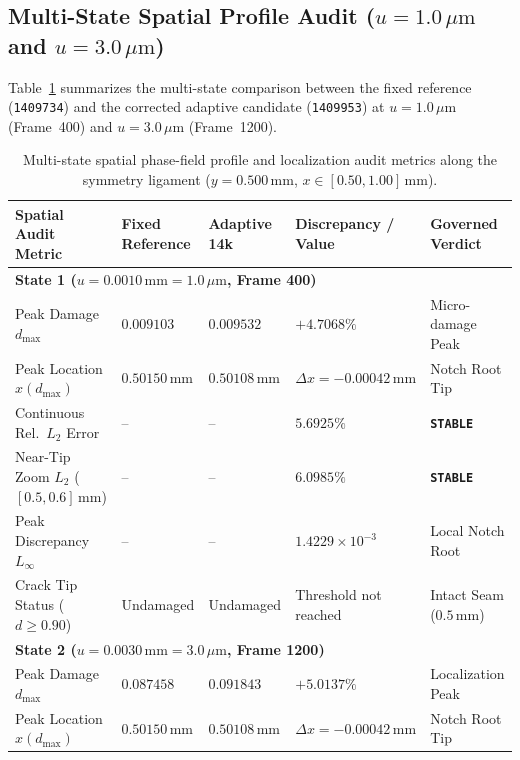 \subsection{Multi-State Spatial Profile Audit (\texorpdfstring{$u = 1.0\,\mu\mathrm{m}$}{u = 1.0 um} and \texorpdfstring{$u = 3.0\,\mu\mathrm{m}$}{u = 3.0 um})}
\label{subsec:stage14q_multistate_results}

Table~\ref{tab:stage14q_profile_comparison} summarizes the multi-state comparison between the fixed reference (\texttt{1409734}) and the corrected adaptive candidate (\texttt{1409953}) at $u = 1.0\,\mu\mathrm{m}$ (Frame~400) and $u = 3.0\,\mu\mathrm{m}$ (Frame~1200).

\begin{table}[htbp]
\centering
\footnotesize
\caption{Multi-state spatial phase-field profile and localization audit metrics along the symmetry ligament ($y = 0.500\,\mathrm{mm}$, $x \in [0.50, 1.00]\,\mathrm{mm}$).}
\label{tab:stage14q_profile_comparison}
\begin{tabularx}{\textwidth}{p{3.5cm} p{2.2cm} p{2.2cm} p{2.6cm} X}
\toprule
\textbf{Spatial Audit Metric} & \textbf{Fixed Reference} & \textbf{Adaptive 14k} & \textbf{Discrepancy / Value} & \textbf{Governed Verdict} \\
\midrule
\multicolumn{5}{l}{\textbf{State 1 ($u = 0.0010\,\mathrm{mm} = 1.0\,\mu\mathrm{m}$, Frame 400)}} \\
Peak Damage $d_{\max}$ & $0.009103$ & $0.009532$ & $+4.7068\%$ & Micro-damage Peak \\
Peak Location $x(d_{\max})$ & $0.50150\,\mathrm{mm}$ & $0.50108\,\mathrm{mm}$ & $\Delta x = -0.00042\,\mathrm{mm}$ & Notch Root Tip \\
Continuous Rel.\ $L_2$ Error & -- & -- & $5.6925\%$ & \textbf{\texttt{STABLE}} \\
Near-Tip Zoom $L_2$ ($[0.5, 0.6]\,\mathrm{mm}$) & -- & -- & $6.0985\%$ & \textbf{\texttt{STABLE}} \\
Peak Discrepancy $L_\infty$ & -- & -- & $1.4229\times 10^{-3}$ & Local Notch Root \\
Crack Tip Status ($d \ge 0.90$) & Undamaged & Undamaged & Threshold not reached & Intact Seam ($0.5\,\mathrm{mm}$) \\
\midrule
\multicolumn{5}{l}{\textbf{State 2 ($u = 0.0030\,\mathrm{mm} = 3.0\,\mu\mathrm{m}$, Frame 1200)}} \\
Peak Damage $d_{\max}$ & $0.087458$ & $0.091843$ & $+5.0137\%$ & Localization Peak \\
Peak Location $x(d_{\max})$ & $0.50150\,\mathrm{mm}$ & $0.50108\,\mathrm{mm}$ & $\Delta x = -0.00042\,\mathrm{mm}$ & Notch Root Tip \\

\end{tabularx}
\end{table}
